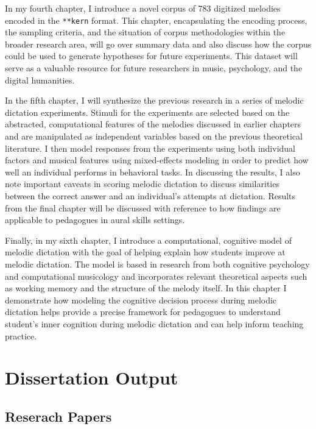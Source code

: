 \documentclass[]{book}
\begin{document}
In my fourth chapter, I introduce a novel corpus of 783 digitized melodies encoded in the \texttt{**kern}
format.
This chapter, encapsulating the encoding process, the sampling criteria, and the situation of corpus methodologies within the broader research area, will go over summary data and also discuss how the corpus could be used to generate hypotheses for future experiments.
This dataset will serve as a valuable resource for future researchers in music, psychology, and the digital humanities.

In the fifth chapter, I will synthesize the previous research in a series of melodic dictation experiments.
Stimuli for the experiments are selected based on the abstracted, computational features of the melodies discussed in earlier chapters and are manipulated as independent variables based on the previous theoretical literature.
I then model responses from the experiments using both individual factors and musical features using mixed-effects modeling in order to predict how well an individual performs in behavioral tasks.
In discussing the results, I also note important caveats in scoring melodic dictation to discuss similarities between the correct answer and an individual's attempts at dictation.
Results from the final chapter will be discussed with reference to how findings are applicable to
pedagogues in aural skills settings.

Finally, in my sixth chapter, I introduce a computational, cognitive model of melodic dictation with the goal of helping explain how students improve at melodic dictation.
The model is based in research from both cognitive psychology \citep{cowanMagicalMysteryFour2010} and computational musicology \citep{pearceStatisticalLearningProbabilistic2018a} and incorporates relevant theoretical aspects such as working memory \citep{chenetteReframingAuralSkills2019, vanhandelRoleWorkingMemory2011} and the structure of the melody itself.
In this chapter I demonstrate how modeling the cognitive decision process during melodic dictation helps provide a precise framework for pedagogues to understand student's inner cognition during melodic dictation and can help inform teaching practice.

\hypertarget{dissertation-output}{%
\section{Dissertation Output}\label{dissertation-output}}

\hypertarget{reserach-papers}{%
\subsection{Reserach Papers}\label{reserach-papers}}
\end{document}
